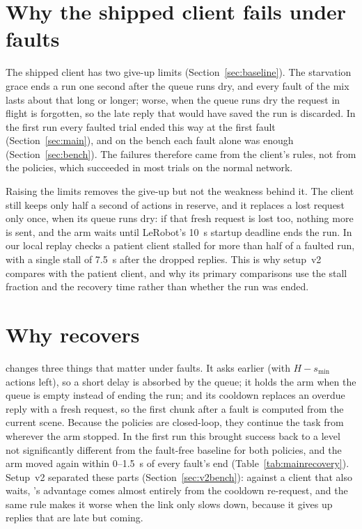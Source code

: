 
\section{Why the shipped client fails under faults}

The shipped client has two give-up limits (Section~\ref{sec:baseline}). The starvation grace ends a run one second
after the queue runs dry, and every fault of the mix lasts about that long or longer; worse, when the queue runs dry
the request in flight is forgotten, so the late reply that would have saved the run is discarded. In the first run
every faulted trial ended this way at the first fault (Section~\ref{sec:main}), and on the bench each fault alone was
enough (Section~\ref{sec:bench}). The failures therefore came from the client's rules, not from the policies, which
succeeded in most trials on the normal network.

Raising the limits removes the give-up but not the weakness behind it. The client still keeps only half a second of
actions in reserve, and it replaces a lost request only once, when its queue runs dry: if that fresh request is lost
too, nothing more is sent, and the arm waits until LeRobot's 10~s startup deadline ends the run. In our local replay checks a patient client stalled for more than half of a faulted run, with a single
stall of 7.5~s after the dropped replies. This is why setup~v2 compares \drtc{} with the patient client, and why its
primary comparisons use the stall fraction and the recovery time rather than whether the run was ended.

\section{Why \drtc{} recovers}

\drtc{} changes three things that matter under faults. It asks earlier (with $H-s_{\min}$ actions left), so a short
delay is absorbed by the queue; it holds the arm when the queue is empty instead of ending the run; and its cooldown
replaces an overdue reply with a fresh request, so the first chunk after a fault is computed from the current scene.
Because the policies are closed-loop, they continue the task from wherever the arm stopped. In the first run this
brought success back to a level not significantly different from the fault-free baseline for both policies, and the
arm moved again within 0--1.5~s of every fault's end (Table~\ref{tab:mainrecovery}). Setup~v2 separated these parts
(Section~\ref{sec:v2bench}): against a client that also waits, \drtc's advantage comes almost entirely from the
cooldown re-request, and the same rule makes it worse when the link only slows down, because it gives up replies that
are late but coming.

